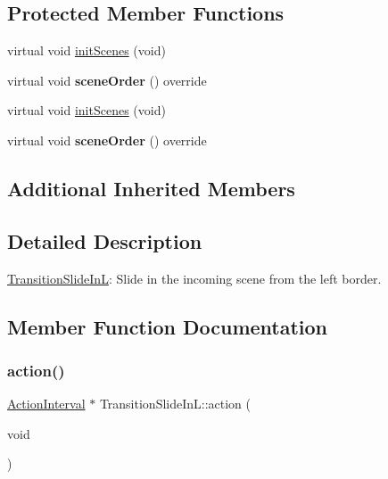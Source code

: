 \subsection*{Protected Member Functions}
\begin{DoxyCompactItemize}
\item 
virtual void \hyperlink{classTransitionSlideInL_abac332ac289d8ed399168d7a428be3b7}{init\+Scenes} (void)
\item 
\mbox{\label{classTransitionSlideInL_a44bf13002e723d951ca642068533f8a5}} 
virtual void {\bfseries scene\+Order} () override
\item 
virtual void \hyperlink{classTransitionSlideInL_af16fe2f52258fe7a9a6516ba359d0c42}{init\+Scenes} (void)
\item 
\mbox{\label{classTransitionSlideInL_a10928e855365b1fc82729f92141e05ca}} 
virtual void {\bfseries scene\+Order} () override
\end{DoxyCompactItemize}
\subsection*{Additional Inherited Members}


\subsection{Detailed Description}
\hyperlink{classTransitionSlideInL}{Transition\+Slide\+InL}\+: Slide in the incoming scene from the left border. 

\subsection{Member Function Documentation}
\mbox{\label{classTransitionSlideInL_a22b0c0b07f15fc0d19fcdf01e4182a3e}} 
\subsubsection{\texorpdfstring{action()}{action()}\hspace{0.1cm}{\footnotesize\ttfamily [1/2]}}
{\footnotesize\ttfamily \hyperlink{classActionInterval}{Action\+Interval} $\ast$ Transition\+Slide\+In\+L\+::action (\begin{DoxyParamCaption}\item[{void}]{ }\end{DoxyParamCaption})\hspace{0.3cm}{\ttfamily [virtual]}}

